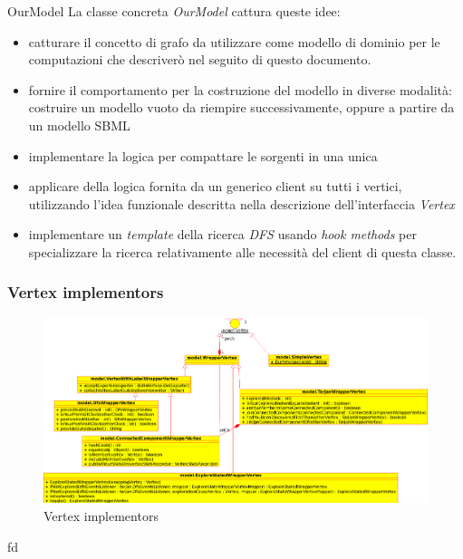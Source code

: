 \begin{paragraph}{OurModel}
La classe concreta \emph{OurModel} cattura queste idee:
\begin{itemize}
\item catturare il concetto di grafo da utilizzare come modello di
  dominio per le computazioni che descriver\`o nel seguito di questo
  documento.
\item fornire il comportamento per la costruzione del modello in
  diverse modalit\`a: costruire un modello vuoto da riempire
  successivamente, oppure a partire da un modello SBML
\item implementare la logica per compattare le sorgenti in una unica
\item applicare della logica fornita da un generico client su tutti i
  vertici, utilizzando l'idea funzionale descritta nella descrizione
  dell'interfaccia \emph{Vertex}
\item implementare un \emph{template} della ricerca \emph{DFS} usando
  \emph{hook methods} per specializzare la ricerca relativamente alle
  necessit\`a del client di questa classe.
\end{itemize}
\end{paragraph}

\subsubsection{Vertex implementors}
\begin{figure}
  \centering
  \includegraphics[angle=90]{packages/vertex-implementors.eps}
  \caption{Vertex implementors}
  \label{fig:vertex-implementors}
\end{figure}
fd